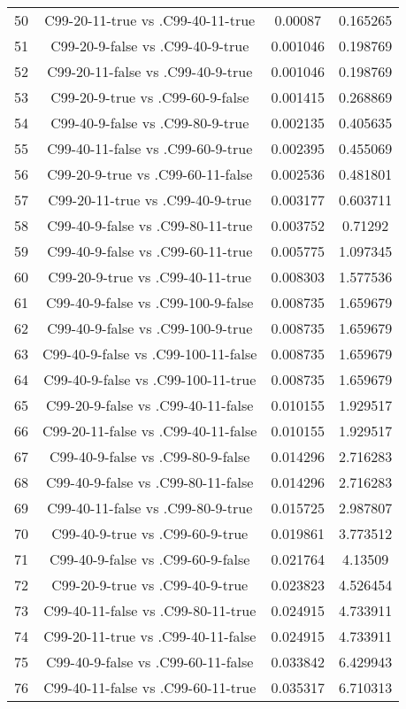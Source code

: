 \documentclass[a4paper,10pt]{article}
\begin{document}
\begin{landscape}
\begin{table}[!htp]
\begin{tabular}{cccc}
50&C99-20-11-true vs .C99-40-11-true&0.00087&0.165265\\
51&C99-20-9-false vs .C99-40-9-true&0.001046&0.198769\\
52&C99-20-11-false vs .C99-40-9-true&0.001046&0.198769\\
53&C99-20-9-true vs .C99-60-9-false&0.001415&0.268869\\
54&C99-40-9-false vs .C99-80-9-true&0.002135&0.405635\\
55&C99-40-11-false vs .C99-60-9-true&0.002395&0.455069\\
56&C99-20-9-true vs .C99-60-11-false&0.002536&0.481801\\
57&C99-20-11-true vs .C99-40-9-true&0.003177&0.603711\\
58&C99-40-9-false vs .C99-80-11-true&0.003752&0.71292\\
59&C99-40-9-false vs .C99-60-11-true&0.005775&1.097345\\
60&C99-20-9-true vs .C99-40-11-true&0.008303&1.577536\\
61&C99-40-9-false vs .C99-100-9-false&0.008735&1.659679\\
62&C99-40-9-false vs .C99-100-9-true&0.008735&1.659679\\
63&C99-40-9-false vs .C99-100-11-false&0.008735&1.659679\\
64&C99-40-9-false vs .C99-100-11-true&0.008735&1.659679\\
65&C99-20-9-false vs .C99-40-11-false&0.010155&1.929517\\
66&C99-20-11-false vs .C99-40-11-false&0.010155&1.929517\\
67&C99-40-9-false vs .C99-80-9-false&0.014296&2.716283\\
68&C99-40-9-false vs .C99-80-11-false&0.014296&2.716283\\
69&C99-40-11-false vs .C99-80-9-true&0.015725&2.987807\\
70&C99-40-9-true vs .C99-60-9-true&0.019861&3.773512\\
71&C99-40-9-false vs .C99-60-9-false&0.021764&4.13509\\
72&C99-20-9-true vs .C99-40-9-true&0.023823&4.526454\\
73&C99-40-11-false vs .C99-80-11-true&0.024915&4.733911\\
74&C99-20-11-true vs .C99-40-11-false&0.024915&4.733911\\
75&C99-40-9-false vs .C99-60-11-false&0.033842&6.429943\\
76&C99-40-11-false vs .C99-60-11-true&0.035317&6.710313\\

\end{tabular}
\end{table}
\end{landscape}
\end{document}
